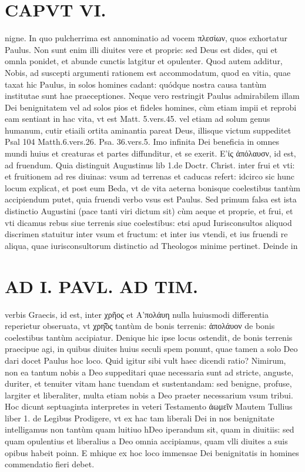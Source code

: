 \documentclass{article}
\begin{document}
\begin{pages}
\section*{CAPVT VI. }
\marginpar{[ p.499 ]}\pstart nigne. In quo pulcherrima est annominatio ad vocem πλεσίων, quos exhortatur Paulus. Non sunt enim illi diuites vere et proprie: sed Deus est dides, qui et omnla ponidet, et abunde cunctis latgitur et opulenter.  \pend\pstart Quod autem additur, Nobis, ad suscepti argumenti rationem est accommodatum, quod ea vitia, quae taxat hic Paulus, in solos homines cadant: quódque nostra causa tantùm institutae sunt hae praeceptiones. Neque vero restringit Paulus admirabilem illam Dei benignitatem vel ad solos pios et fideles homines, cùm etiam impii et reprobi eam sentiant in hac vita, vt est Matt. 5.vers.45. vel etiam ad solum genus humanum, cutir etiaili ortita aminantia pareat Deus, illisque victum suppeditet Psal 104 Matth.6.vers.26. Psa. 36.vers.5. Imo infinita Dei beneficia in omnes mundi huius et creaturas et partes diffunditur, et se exerit.  \pend\pstart Ε’ίς ἀπόλαυσν, id est, ad fruendum. Quia distinguit Augustinus lib 1.de Doctr. Christ. inter frui et vti: et fruitionem ad res diuinas: vsum ad terrenas et caducas refert: idcirco sic hunc locum explicat, et post eum Beda, vt de vita aeterna bonisque coelestibus tantùm accipiendum putet, quia fruendi verbo vsus est Paulus. Sed primum falsa est ista distinctio Augustini (pace tanti viri dictum sit) cùm aeque et proprie, et frui, et vti dicamus rebus siue terrenis siue coelestibus: etsi apud Iurisconsultos aliquod discrimen statuitur inter vsum et fructum: et inter ius vtendi, et ius fruendi re aliqua, quae iurisconsultorum distinctio ad Theologos minime pertinet. Deinde in  \pend
\section*{AD I. PAVL. AD TIM. }
\marginpar{[ p.309. ]}\pstart verbis Graecis, id est, inter χρῆος et Α'πολάυη nulla huiusmodi differentia reperietur obseruata, vt χρη̃͂ος tantùm de bonis terrenis: ἀπολάυον de bonis coelestibus tantùm accipiatur. Denique hic ipse locus ostendit, de bonis terrenis praecipue agi, in quibus diuites huius seculi spem ponunt, quae tamen a solo Deo dari docet Paulus hoc loco. Quid igitur sibi vult haec dicendi ratio? Nimirum, non ea tantum nobis a Deo suppeditari quae necessaria sunt ad stricte, anguste, duriter, et tenuiter vitam hanc tuendam et sustentandam: sed benigne, profuse, largiter et liberaliter, multa etiam nobis a Deo praeter necessarium vsum tribui. Hoc dicunt septuaginta interpretes in veteri Testamento ἀωμεῖν Mautem Tullius liber  1. de Legibus  Prodigere, vt ex hac tam liberali Dei in nos benignitate intelligamus non tantùm quam luitiuo hDeo iperandum sit, quam in diuitiis: sed quam opulentius et liberalius a Deo omnia accipiamus, quam vlli diuites a suis opibus habeit poinn. E mhique ex hoc loco immensae Dei benignitatis in homines commendatio fieri debet.  \pend
{}
{}

\end{pages}
\end{document}
